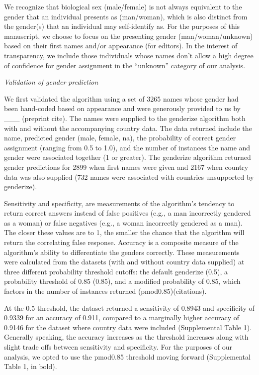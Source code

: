 \documentclass[11pt,]{article}
\begin{document}
We recognize that biological sex (male/female) is not always equivalent
to the gender that an individual presents as (man/woman), which is also
distinct from the gender(s) that an individual may self-identify as. For
the purposes of this manuscript, we choose to focus on the presenting
gender (man/woman/unknown) based on their first names and/or appearance
(for editors). In the interest of transparency, we include those
individuals whose names don't allow a high degree of confidence for
gender assignment in the ``unknown'' category of our analysis.

\emph{Validation of gender prediction}

We first validated the algorithm using a set of 3265 names whose gender
had been hand-coded based on appearance and were generously provided to
us by \_\_\_ (preprint cite). The names were supplied to the genderize
algorithm both with and without the accompanying country data. The data
returned include the name, predicted gender (male, female, na), the
probability of correct gender assignment (ranging from 0.5 to 1.0), and
the number of instances the name and gender were associated together (1
or greater). The genderize algorithm returned gender predictions for
2899 when first names were given and 2167 when country data was also
supplied (732 names were associated with countries unsupported by
genderize).

Sensitivity and specificity, are measurements of the algorithm's
tendency to return correct answers instead of false positives (e.g., a
man incorrectly gendered as a woman) or false negatives (e.g., a woman
incorrectly gendered as a man). The closer these values are to 1, the
smaller the chance that the algorithm will return the correlating false
response. Accuracy is a composite measure of the algorithm's ability to
differentiate the genders correctly. These measurements were calculated
from the datasets (with and without country data supplied) at three
different probability threshold cutoffs: the default genderize (0.5), a
probability threshold of 0.85 (0.85), and a modified probability of
0.85, which factors in the number of instances returned
(pmod0.85)(citations).

At the 0.5 threshold, the dataset returned a sensitivity of 0.8943 and
specificity of 0.9339 for an accuracy of 0.911, compared to a marginally
higher accuracy of 0.9146 for the dataset where country data were
included (Supplemental Table 1). Generally speaking, the accuracy
increases as the threshold increases along with slight trade offs
between sensitivity and specificity. For the purposes of our analysis,
we opted to use the pmod0.85 threshold moving forward (Supplemental
Table 1, in bold).
\end{document}
